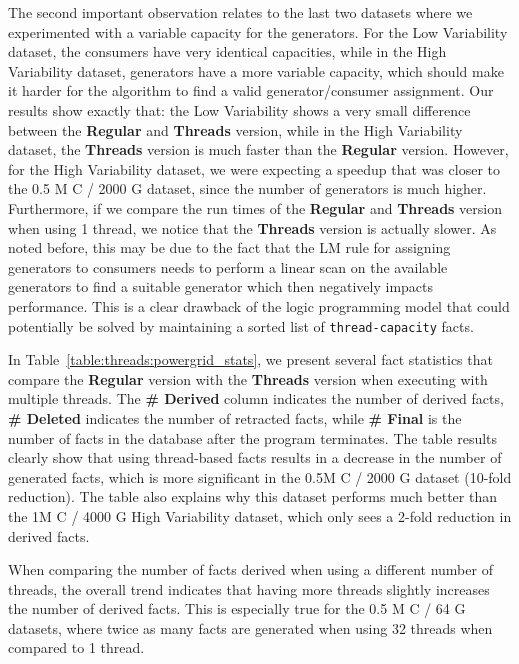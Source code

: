 The second important observation relates to the last two datasets where we
experimented with a variable capacity for the generators. For the Low
Variability dataset, the consumers have very identical capacities, while in the
High Variability dataset, generators have a more variable capacity, which should
make it harder for the algorithm to find a valid generator/consumer assignment.
Our results show exactly that: the Low Variability shows a very small difference
between the \textbf{Regular} and \textbf{Threads} version, while in the High
Variability dataset, the \textbf{Threads} version is much faster than the
\textbf{Regular} version. However, for the High Variability dataset, we were
expecting a speedup that was closer to the 0.5 M C / 2000 G dataset, since the
number of generators is much higher. Furthermore, if we compare the run times of
the \textbf{Regular} and \textbf{Threads} version when using 1 thread, we notice
that the \textbf{Threads} version is actually slower. As noted before, this may
be due to the fact that the LM rule for assigning generators to consumers needs
to perform a linear scan on the available generators to find a suitable
generator which then negatively impacts performance. This is a clear drawback of
the logic programming model that could potentially be solved by maintaining a
sorted list of \texttt{thread-capacity} facts.

In Table~\ref{table:threads:powergrid_stats}, we present several fact statistics
that compare the \textbf{Regular} version with the \textbf{Threads} version when
executing with multiple threads. The \textbf{\# Derived} column indicates the
number of derived facts, \textbf{\# Deleted} indicates the number of retracted
facts, while \textbf{\# Final} is the number of facts in the database after the
program terminates. The table results clearly show that using thread-based facts
results in a decrease in the number of generated facts, which is more
significant in the 0.5M C / 2000 G dataset (10-fold reduction). The table also
explains why this dataset performs much better than the 1M C / 4000 G High
Variability dataset, which only sees a 2-fold reduction in derived facts.

When comparing the number of facts derived when using a different number of
threads, the overall trend indicates that having more threads slightly increases
the number of derived facts. This is especially true for the 0.5 M C / 64 G
datasets, where twice as many facts are generated when using 32 threads when
compared to 1 thread.

\begin{table}[ht]
   \begin{center}
      
   \end{center}

   \label{table:threads:powergrid_stats}
\end{table}


